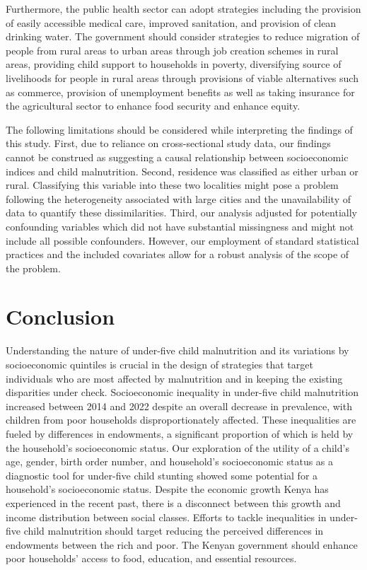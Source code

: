 \documentclass[sn-basic,Numbered,pdflatex]{sn-jnl}
\theoremstyle{remark}
\theoremstyle{definition}
\begin{document}
Furthermore, the public health sector can adopt strategies including the
provision of easily accessible medical care, improved sanitation, and
provision of clean drinking water. The government should consider
strategies to reduce migration of people from rural areas to urban areas
through job creation schemes in rural areas, providing child support to
households in poverty, diversifying source of livelihoods for people in
rural areas through provisions of viable alternatives such as commerce,
provision of unemployment benefits as well as taking insurance for the
agricultural sector to enhance food security and enhance equity.

The following limitations should be considered while interpreting the
findings of this study. First, due to reliance on cross-sectional study
data, our findings cannot be construed as suggesting a causal
relationship between socioeconomic indices and child malnutrition.
Second, residence was classified as either urban or rural. Classifying
this variable into these two localities might pose a problem following
the heterogeneity associated with large cities and the unavailability of
data to quantify these dissimilarities. Third, our analysis adjusted for
potentially confounding variables which did not have substantial
missingness and might not include all possible confounders. However, our
employment of standard statistical practices and the included covariates
allow for a robust analysis of the scope of the problem.

\hypertarget{sec13}{%
\section{Conclusion}\label{sec13}}

Understanding the nature of under-five child malnutrition and its
variations by socioeconomic quintiles is crucial in the design of
strategies that target individuals who are most affected by malnutrition
and in keeping the existing disparities under check. Socioeconomic
inequality in under-five child malnutrition increased between 2014 and
2022 despite an overall decrease in prevalence, with children from poor
households disproportionately affected. These inequalities are fueled by
differences in endowments, a significant proportion of which is held by
the household's socioeconomic status. Our exploration of the utility of
a child's age, gender, birth order number, and household's socioeconomic
status as a diagnostic tool for under-five child stunting showed some
potential for a household's socioeconomic status. Despite the economic
growth Kenya has experienced in the recent past, there is a disconnect
between this growth and income distribution between social classes.
Efforts to tackle inequalities in under-five child malnutrition should
target reducing the perceived differences in endowments between the rich
and poor. The Kenyan government should enhance poor households' access
to food, education, and essential resources.
\end{document}
